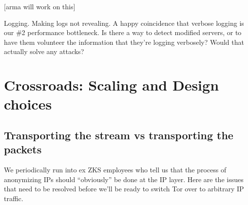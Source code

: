 \documentclass{llncs}
\begin{document}
[arma will work on this]


Logging. Making logs not revealing. A happy coincidence that verbose
logging is our \#2 performance bottleneck. Is there a way to detect
modified servers, or to have them volunteer the information that they're
logging verbosely? Would that actually solve any attacks?

\section{Crossroads: Scaling and Design choices}
\label{sec:crossroads-design}

\subsection{Transporting the stream vs transporting the packets}

We periodically run into ex ZKS employees who tell us that the process of
anonymizing IPs should ``obviously'' be done at the IP layer. Here are
the issues that need to be resolved before we'll be ready to switch Tor
over to arbitrary IP traffic.
\end{document}
